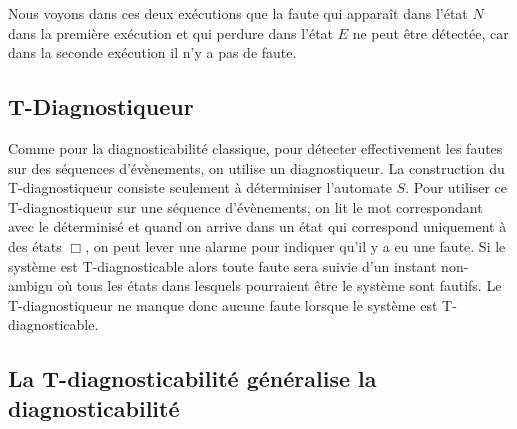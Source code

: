 \documentclass[conference]{IEEEtran}
\begin{document}
Nous voyons dans ces deux ex\'ecutions que la faute qui apparaît dans l'état $N$ dans la premi\`ere ex\'ecution et qui perdure dans l'état $E$ ne peut être détectée, car dans la seconde exécution il n'y a pas de faute.

\subsection{T-Diagnostiqueur}
Comme pour la diagnosticabilité classique, pour détecter effectivement les fautes sur des séquences d'évènements, on utilise un diagnostiqueur.
La construction du T-diagnostiqueur consiste seulement à d\'eterminiser l'automate $S$. Pour utiliser ce T-diagnostiqueur sur une séquence d'évènements, on lit le mot correspondant avec le déterminisé et quand on arrive dans un \'etat qui correspond uniquement à des \'etats $\Box$, on peut lever une alarme pour indiquer qu'il y a eu une faute. Si le système est T-diagnosticable alors toute faute sera suivie d'un instant non-ambigu où tous les états dans lesquels pourraient être le système sont fautifs. Le T-diagnostiqueur ne manque donc aucune faute lorsque le système est T-diagnosticable.

\subsection{La T-diagnosticabilité généralise la diagnosticabilité}
\end{document}
